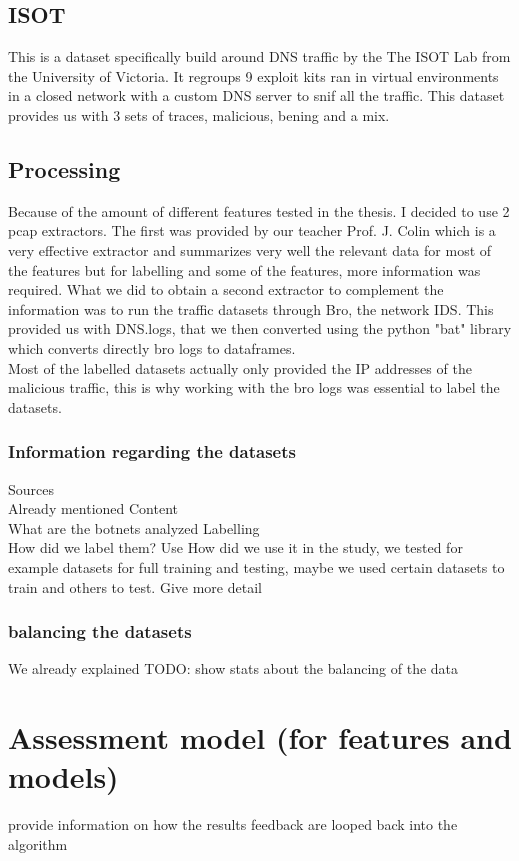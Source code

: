 \subsection{ISOT}
This is a dataset specifically build around DNS traffic by the The ISOT Lab from the University of Victoria. It regroups 9 exploit kits ran in virtual environments in a closed network with a custom DNS server to snif all the traffic. This dataset provides us with 3 sets of traces, malicious, bening and a mix\cite{ISOT}.
\subsection{Processing}
Because of the amount of different features tested in the thesis. I decided to use 2 pcap extractors. The first was provided by our teacher Prof. J. Colin which is a very effective extractor and summarizes very well the relevant data for most of the features but for labelling and some of the features, more information was required. What we did to obtain a second extractor to complement the information was to run the traffic datasets through Bro, the network IDS. This provided us with DNS.logs, that we then converted using the python "bat" library which converts directly bro logs to dataframes.\\
Most of the labelled datasets actually only provided the IP addresses of the malicious traffic, this is why working with the bro logs was essential to label the datasets.

\subsubsection{Information regarding the datasets}
Sources\\
	Already mentioned
Content\\
	What are the botnets analyzed
Labelling\\
	How did we label them?
Use
	How did we use it in the study, we tested for example datasets for full training and testing, maybe we used certain datasets to train and others to test. Give more detail
\subsubsection{balancing the datasets}
We already explained
TODO: show stats about the balancing of the data
\section{Assessment model (for features and models)}
provide information on how the results feedback are looped back into the algorithm

